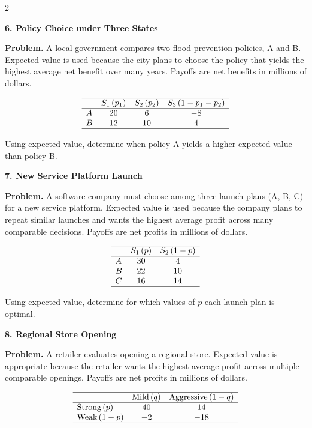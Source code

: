 \documentclass[12pt]{article}
\newcommand{\SubsectionBox}[1]{%
	\noindent\colorbox{gray!30}{%
		\parbox{\linewidth}{\textbf{#1}}%
	}\par\vspace{0.35cm}%
}
\begin{document}
\begin{multicols}{2}
		\vspace{0.25cm}
		\SubsectionBox{6. Policy Choice under Three States}\vspace{-0.25cm}
		\textbf{Problem.}
		A local government compares two flood-prevention policies, A and B. Expected value is used because the city plans to choose the policy that yields the highest average net benefit over many years. Payoffs are net benefits in millions of dollars.
		
		\[
		\begin{array}{lccc}
			\hline
			& S_1\,(p_1) & S_2\,(p_2) & S_3\,(1-p_1-p_2) \\
			\hline
			A & 20 & 6 & -8 \\
			B & 12 & 10 & 4 \\
			\hline
		\end{array}
		\]
		
		Using expected value, determine when policy A yields a higher expected value than policy B.
		
		\vspace{0.25cm}
		\SubsectionBox{7. New Service Platform Launch}\vspace{-0.25cm}
		\textbf{Problem.}
		A software company must choose among three launch plans (A, B, C) for a new service platform. Expected value is used because the company plans to repeat similar launches and wants the highest average profit across many comparable decisions. Payoffs are net profits in millions of dollars.
		
		\[
		\begin{array}{lcc}
			\hline
			& S_1\,(p) & S_2\,(1-p) \\
			\hline
			A & 30 & 4 \\
			B & 22 & 10 \\
			C & 16 & 14 \\
			\hline
		\end{array}
		\]
		
		Using expected value, determine for which values of \(p\) each launch plan is optimal.
		
		\vspace{0.25cm}
		\SubsectionBox{8. Regional Store Opening}\vspace{-0.25cm}
		\textbf{Problem.}
		A retailer evaluates opening a regional store. Expected value is appropriate because the retailer wants the highest average profit across multiple comparable openings. Payoffs are net profits in millions of dollars.
		
		\[
		\begin{array}{lcc}
			\hline
			& \text{Mild}\,(q) & \text{Aggressive}\,(1-q) \\
			\hline
			\text{Strong}\,(p) & 40 & 14 \\
			\text{Weak}\,(1-p) & -2 & -18 \\
			\hline
		\end{array}
		\]
		

\end{multicols}
\end{document}
